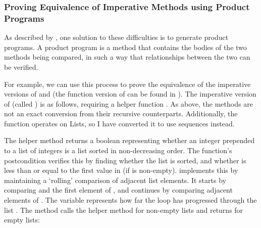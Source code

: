 \subsubsection{Proving Equivalence of Imperative Methods using Product Programs}

As described by \textcite{lahiriDifferentialAssertionChecking2013}, one solution to these difficulties is to generate product programs. A product program is a method that contains the bodies of the two methods being compared, in such a way that relationships between the two can be verified.

For example, we can use this process to prove the equivalence of the imperative versions of  and  (the function version of  can be found in ). The imperative version of  (called ) is as follows, requiring a helper function . As above, the methods are not an exact conversion from their recursive counterparts. Additionally, the  function operates on Lists, so I have converted it to use sequences instead. 

The helper method  returns a boolean representing whether an integer  prepended to a list of integers  is a list sorted in non-decreasing order. The function's postcondition verifies this by finding whether the list  is sorted, and whether  is less than or equal to the first value in  (if  is non-empty).  implements this by maintaining a `rolling' comparison of adjacent list elements. It starts by comparing  and the first element of , and continues by comparing adjacent elements of . The variable  represents how far the loop has progressed through the list . The  method calls the helper method  for non-empty lists and returns  for empty lists:

